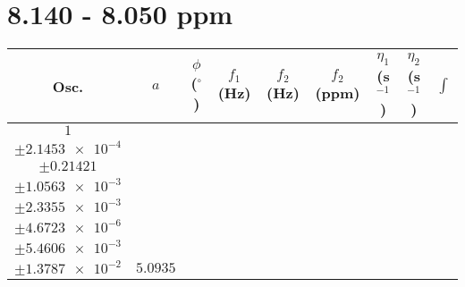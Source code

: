 \documentclass[8pt]{article}
\begin{document}
\section*{8.140 - 8.050 ppm}
\begin{longtable}[l]{c c c c c c c c c}
\toprule
Osc. & $a$ & $\phi$ ($^{\circ}$) & $f_1$ (Hz) & $f_2$ (Hz) & $f_2$ (ppm) & $\eta_1$ (s$^{-1}$) & $\eta_2$ (s$^{-1}$) & $\int$\\
\midrule
$\num{1}$ & \begin{tabular}[c]{@{}c@{}}$\num{6.4549e-2}$ \\ $\pm\num{2.1453e-4}$\end{tabular} & \begin{tabular}[c]{@{}c@{}}$\num{0.10538}$ \\ $\pm\num{0.21421}$\end{tabular} & \begin{tabular}[c]{@{}c@{}}$\num{-4.4484}$ \\ $\pm\num{1.0563e-3}$\end{tabular} & \begin{tabular}[c]{@{}c@{}}$\num{4.0408e+3}$ \\ $\pm\num{2.3355e-3}$\end{tabular} & \begin{tabular}[c]{@{}c@{}}$\num{8.0838}$ \\ $\pm\num{4.6723e-6}$\end{tabular} & \begin{tabular}[c]{@{}c@{}}$\num{1.6848}$ \\ $\pm\num{5.4606e-3}$\end{tabular} & \begin{tabular}[c]{@{}c@{}}$\num{4.5068}$ \\ $\pm\num{1.3787e-2}$\end{tabular} & $\num{5.0935}$\\

\end{longtable}
\end{document}
